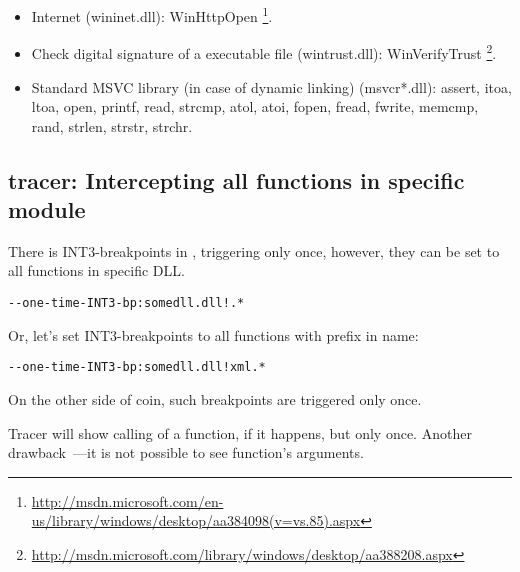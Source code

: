 \begin{itemize}
\item
{} Internet
(wininet.dll):
WinHttpOpen
\footnote{\url{http://msdn.microsoft.com/en-us/library/windows/desktop/aa384098(v=vs.85).aspx}}.

\item
{}
{Check digital signature of a executable file} (wintrust.dll):
WinVerifyTrust
\footnote{\url{http://msdn.microsoft.com/library/windows/desktop/aa388208.aspx}}.

\item
{}
{Standard MSVC library (in case of dynamic linking)} (msvcr*.dll):
assert, itoa, ltoa, open, printf, read, strcmp, atol, atoi, fopen, fread, fwrite, memcmp, rand,
strlen, strstr, strchr.

\end{itemize}

\subsection{tracer: 
{Intercepting all functions in specific module}}

{There is INT3-breakpoints in \tracer, triggering only once, however, they can be set to all functions
in specific DLL.}

\begin{lstlisting}
--one-time-INT3-bp:somedll.dll!.*
\end{lstlisting}

{Or, let's set INT3-breakpoints to all functions with  prefix in name:}

\begin{lstlisting}
--one-time-INT3-bp:somedll.dll!xml.*
\end{lstlisting}

{On the other side of coin, such breakpoints are triggered only once.}

Tracer 
{will show calling of a function, if it happens, but only once.}
{Another drawback~---it is not possible to see function's arguments.}

